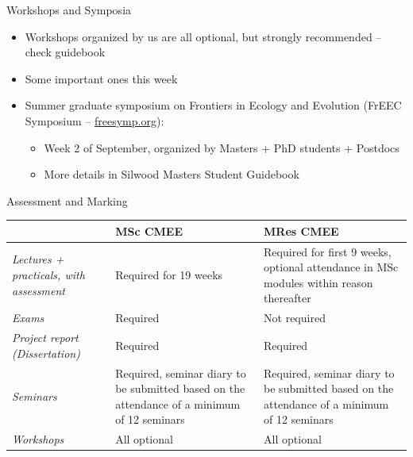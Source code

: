 \documentclass[xcolor={usenames,x11names},compress]{beamer}
\renewcommand{\(}{\begin{columns}}
\renewcommand{\)}{\end{columns}}
\newcommand{\<}[1]{\begin{column}{#1}}
\renewcommand{\>}{\end{column}}
\begin{document}
\begin{frame}{Workshops and Symposia}

  \begin{itemize}\setlength{\itemindent}{0em}\itemsep12pt

    \item Workshops organized by us are all optional, but strongly recommended -- check guidebook
    \item Some important ones this week

    \item Summer graduate symposium on Frontiers in Ecology and Evolution (FrEEC Symposium -- \url{freesymp.org}):
    \begin{itemize}\setlength{\itemindent}{-1em}
      \item Week 2 of September, organized by Masters + PhD students + Postdocs
      \item More details in Silwood Masters Student Guidebook
    \end{itemize}
 \end{itemize}  
  \end{frame}

\begin{frame}{Assessment and Marking}

\small

\begin{center}
  \begin{tabular}{>{\it}P{3cm}|P{3cm}|P{4.9cm}}
    \hline
     &  {\bf MSc CMEE} & {\bf MRes 
CMEE}\\ \hline
      Lectures + practicals, with assessment & Required for 19 weeks &
Required for first 9 weeks, optional attendance in MSc modules within reason
thereafter \\ \hline
    Exams & Required & Not required \\
\hline
  Project report (Dissertation) & Required & Required \\ \hline
   Seminars & Required, seminar diary to be submitted based on
the attendance of a minimum of 12 seminars & Required, seminar diary to be submitted based on
the attendance of a minimum of 12 seminars\\ \hline
  Workshops & All optional & All optional \\
\hline

\end{tabular}
  
\end{center}
  \end{frame}
\end{document}
